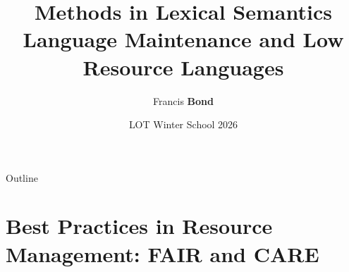 \documentclass[xetex]{beamer}  %
\title[Lexical Relations]{Methods in Lexical Semantics \\
Language Maintenance and Low Resource Languages}
\author{Francis \textbf{Bond}}
\institute[Palacký]{Department of Asian Studies,
\\  Palacký University, Olomouc, Czechia
\\[1.5ex] \url{<bond@ieee.org>}}
\date{LOT Winter School 2026}
\begin{document}
\maketitle

\begin{frame}{Outline}
   \tableofcontents
 \end{frame}



\section{Best Practices in Resource Management: FAIR and CARE}
\end{document}
